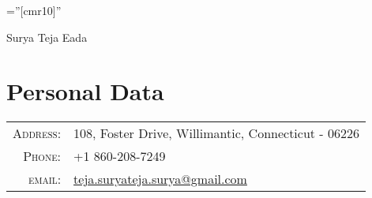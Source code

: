 \documentclass[a4paper,10pt]{article}
\begin{document}

\pagestyle{empty} %

\font\fb=''[cmr10]'' %

\par{\centering
		{\Huge Surya Teja Eada 
	}\bigskip\par}

\section{Personal Data}

\begin{tabular}{rl}
    \textsc{Address:}   & 108, Foster Drive, Willimantic, Connecticut - 06226 \\
    \textsc{Phone:}     & +1 860-208-7249\\
    \textsc{email:}     & \href{mailto:teja.suryateja.surya@gmail.com}{teja.suryateja.surya@gmail.com}
\end{tabular}

\end{document}
